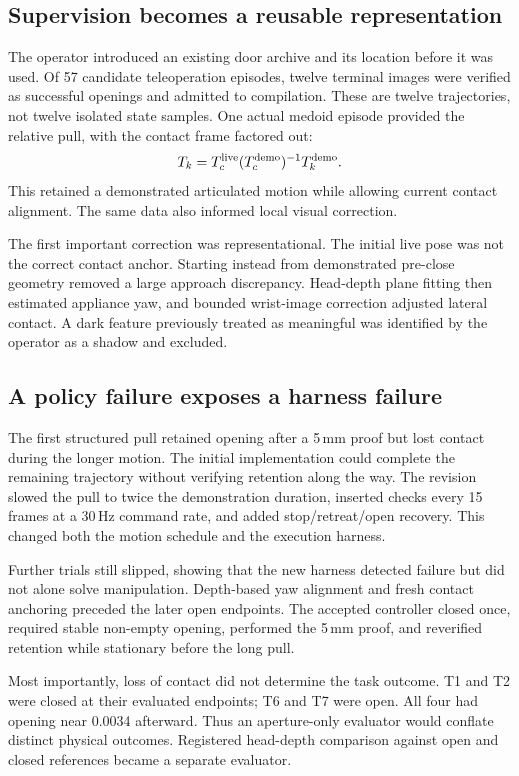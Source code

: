 \subsection{Supervision becomes a reusable representation}
The operator introduced an existing door archive and its location before it
was used. Of 57 candidate teleoperation episodes, twelve terminal images were
verified as successful openings and admitted to compilation. These are twelve
trajectories, not twelve isolated state samples. One actual medoid episode
provided the relative pull, with the contact frame factored out:
\begin{equation}
 T_k=T_c^{\rm live}(T_c^{\rm demo})^{-1}T_k^{\rm demo}.
\end{equation}
This retained a demonstrated articulated motion while allowing current
contact alignment. The same data also informed local visual correction.

The first important correction was representational. The initial live pose
was not the correct contact anchor. Starting instead from demonstrated
pre-close geometry removed a large approach discrepancy. Head-depth plane
fitting then estimated appliance yaw, and bounded wrist-image correction
adjusted lateral contact. A dark feature previously treated as meaningful was
identified by the operator as a shadow and excluded.

\subsection{A policy failure exposes a harness failure}
The first structured pull retained opening after a 5\,mm proof but lost
contact during the longer motion. The initial implementation could complete
the remaining trajectory without verifying retention along the way. The
revision slowed the pull to twice the demonstration duration, inserted checks
every 15 frames at a 30\,Hz command rate, and added stop/retreat/open recovery.
This changed both the motion schedule and the execution harness.

Further trials still slipped, showing that the new harness detected failure
but did not alone solve manipulation. Depth-based yaw alignment and fresh
contact anchoring preceded the later open endpoints. The accepted controller
closed once, required stable non-empty opening, performed the 5\,mm proof,
and reverified retention while stationary before the long pull.

Most importantly, loss of contact did not determine the task outcome. T1 and
T2 were closed at their evaluated endpoints; T6 and T7 were open. All four
had opening near 0.0034 afterward. Thus an aperture-only evaluator would
conflate distinct physical outcomes. Registered head-depth comparison against
open and closed references became a separate evaluator.

